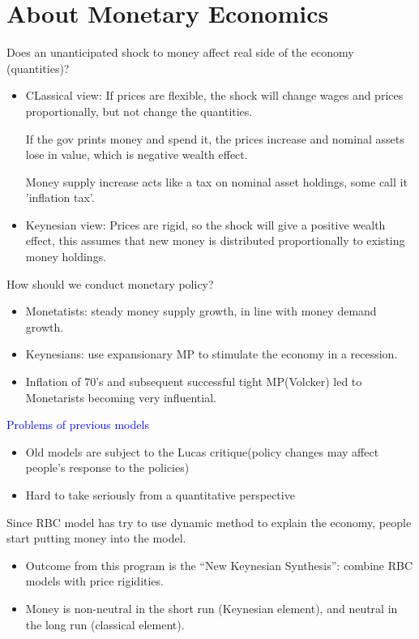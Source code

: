 \section{About Monetary Economics}

Does an unanticipated shock to money affect real side of the
economy (quantities)?

\begin{itemize}
    \item CLassical view: If prices are flexible, the shock
    will change wages and prices proportionally, but not change the quantities.

    If the gov prints money and spend it, the prices increase and nominal assets lose in value, 
    which is negative wealth effect.

    Money supply increase acts like a tax on nominal asset 
    holdings, some call it 'inflation tax'.

    \item Keynesian view: Prices are rigid, so the shock will
    give a positive wealth effect, this assumes that new money is distributed proportionally to existing money holdings.
\end{itemize}

How should we conduct monetary policy?

\begin{itemize}
    \item Monetatists: steady money supply growth, in line with money
    demand growth.
    \item Keynesians: use expansionary MP to stimulate the economy
    in a recession.
    \item Inﬂation of 70's and subsequent successful tight MP(Volcker)
    led to Monetarists becoming very inﬂuential.
\end{itemize}

\textcolor{blue}{Problems of previous models}

\begin{itemize}
    \item Old models are subject to the Lucas critique(policy changes
    may affect people's response to the policies)
    \item Hard to take seriously from a quantitative perspective
\end{itemize}

Since RBC model has try to use dynamic method to explain the economy, 
people start putting money into the model.

\begin{itemize}
    \item Outcome from this program is the “New Keynesian
    Synthesis”: combine RBC models with price rigidities.
    \item Money is non-neutral in the short run (Keynesian
    element), and neutral in the long run (classical element).
\end{itemize}

